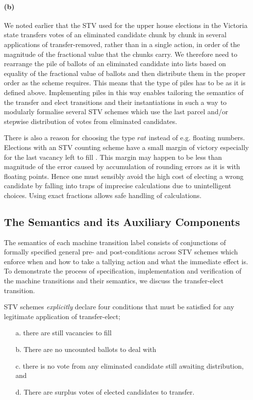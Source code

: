 \documentclass[10pt,conference]{IEEEtran}
\begin{document}
\paragraph*{(b)} We noted earlier that the STV used for the upper house elections in the Victoria state transfers votes of an eliminated candidate chunk by chunk in several applications of transfer-removed, rather than in a single action, in order of the magnitude of the fractional value that the chunks carry. We therefore need to rearrange the pile of ballots of an eliminated candidate into lists based on equality of the fractional value of ballots and then distribute them in the proper order as the scheme requires. This means that the type of piles has to be as it is defined above. Implementing piles in this way enables
tailoring the semantics of the transfer and elect transitions and their instantiations in such a way to modularly formalise several STV schemes which use the last parcel and/or stepwise distribution of votes from eliminated candidates. 


There is also a reason for choosing the type $rat$  
instead of e.g. floating numbers. Elections with an STV counting scheme have a small margin of victory especially for the last vacancy left to fill \cite{MBlo}. This margin may happen to be less than magnitude of the error caused by accumulation of rounding errors as it is with floating points.  Hence one must sensibly avoid the high  cost of electing a wrong candidate by falling into traps of imprecise calculations due to unintelligent choices. Using exact fractions allows safe handling of calculations. 
\subsection{The Semantics and its Auxiliary Components}
\label{sec:MachineSem}

The semantics of each machine transition label consists of conjunctions of formally specified general pre- and post-conditions across STV schemes which enforce when and how to take a tallying action and what the immediate effect is. To demonstrate the process of specification, implementation and verification of the machine transitions and their semantics, we discuss the transfer-elect transition.


STV schemes \emph{explicitly} declare four conditions that must be satisfied  for any legitimate application of transfer-elect; 
\begin{itemize}
\item[a.] there are still vacancies to fill
\item[b.] There are no uncounted ballots to deal with
\item[c.] there is no vote from any eliminated candidate still awaiting distribution, and
\item[d.] There are surplus votes of elected candidates to  transfer.
\end{itemize}
\end{document}
